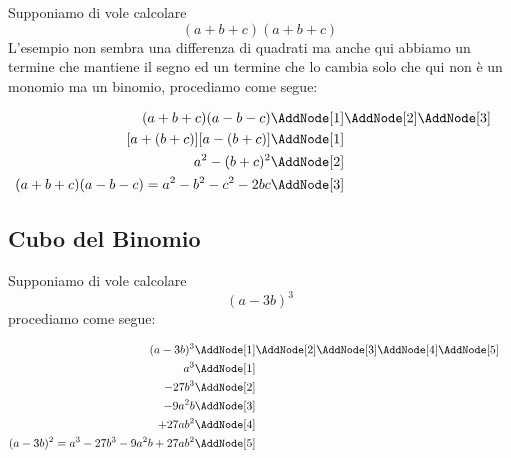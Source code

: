 \begin{esempio}
Supponiamo di vole calcolare \[(a+b+c)(a+b+c)\]
L'esempio non sembra una differenza di quadrati ma anche qui abbiamo un termine che mantiene il segno ed un termine che lo cambia solo che qui non è un monomio ma un binomio, procediamo come segue:
\begin{NodesList}
	\begin{align*}
		(a+b+c)(a-b-c)&\AddNode[1]\AddNode[2]\AddNode[3]\\
		[a+(b+c)][a-(b+c)]&\AddNode[1]&\\ 
		a^2-(b+c)^2&\AddNode[2]&\\
		(a+b+c)(a-b-c)=a^2-b^2-c^2-2bc&\AddNode[3]
	\end{align*}
\end{NodesList}
\end{esempio}
\subsection{Cubo del Binomio}
\begin{esempio}
Supponiamo di vole calcolare \[(a-3b)^3\]
procediamo come segue:
\begin{NodesList}
	\begin{align*}
		(a-3b)^3&\AddNode[1]\AddNode[2]\AddNode[3]\AddNode[4]\AddNode[5]\\
		a^3&\AddNode[1]&\\ 
		-27b^3&\AddNode[2]&\\
		-9a^2b&\AddNode[3]\\
		+27ab^2&\AddNode[4]\\
		(a-3b)^2=a^3-27b^3-9a^2b+27ab^2&\AddNode[5]
	\end{align*}
\end{NodesList}
\end{esempio}
